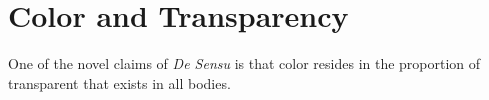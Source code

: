 
\section{Color and Transparency} %
\label{sec:color_and_transparency}

One of the novel claims of \emph{De Sensu} is that color resides in the proportion of transparent that exists in all bodies.



